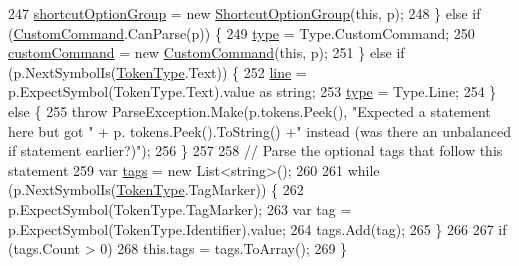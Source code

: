 \begin{DoxyCode}
247                     \hyperlink{a00142_a54d73ad69c4af4a0d61edeaea4c8ca4f}{shortcutOptionGroup} = \textcolor{keyword}{new} 
      \hyperlink{a00142_a518000e4e6219ce5f9f4229f505cd944ae8a0b2e51320b69d57d378776ee0647a}{ShortcutOptionGroup}(\textcolor{keyword}{this}, p);
248                 \} \textcolor{keywordflow}{else} \textcolor{keywordflow}{if} (\hyperlink{a00142_a518000e4e6219ce5f9f4229f505cd944af6b081742758e5cbc3a2e679e521a4fe}{CustomCommand}.CanParse(p)) \{
249                     \hyperlink{a00142_aa3fa0eb260e412720562ce06b7dc06fe}{type} = Type.CustomCommand;
250                     \hyperlink{a00142_a8a98e7d4c66f9909da865f0e671d69f2}{customCommand} = \textcolor{keyword}{new} \hyperlink{a00142_a518000e4e6219ce5f9f4229f505cd944af6b081742758e5cbc3a2e679e521a4fe}{CustomCommand}(\textcolor{keyword}{this}, p);
251                 \} \textcolor{keywordflow}{else} \textcolor{keywordflow}{if} (p.NextSymbolIs(\hyperlink{a00031_a301aa7c866593a5b625a8fc158bbeace}{TokenType}.Text)) \{
252                     \hyperlink{a00142_a37695c7b00776bb292fd64894a70fb72}{line} = p.ExpectSymbol(TokenType.Text).value as \textcolor{keywordtype}{string};
253                     \hyperlink{a00142_aa3fa0eb260e412720562ce06b7dc06fe}{type} = Type.Line;
254                 \} \textcolor{keywordflow}{else} \{
255                     \textcolor{keywordflow}{throw} ParseException.Make(p.tokens.Peek(), \textcolor{stringliteral}{"Expected a statement here but got "} + p.
      tokens.Peek().ToString() +\textcolor{stringliteral}{" instead (was there an unbalanced if statement earlier?)"});
256                 \}
257 
258                 \textcolor{comment}{// Parse the optional tags that follow this statement}
259                 var \hyperlink{a00122_a58b3a15788fd2d4127d73619dc6d04ae}{tags} = \textcolor{keyword}{new} List<string>();
260 
261                 \textcolor{keywordflow}{while} (p.NextSymbolIs(\hyperlink{a00031_a301aa7c866593a5b625a8fc158bbeace}{TokenType}.TagMarker)) \{
262                     p.ExpectSymbol(TokenType.TagMarker);
263                     var tag = p.ExpectSymbol(TokenType.Identifier).value;
264                     tags.Add(tag);
265                 \}
266 
267                 \textcolor{keywordflow}{if} (tags.Count > 0)
268                     this.tags = tags.ToArray();
269             \}
\end{DoxyCode}


